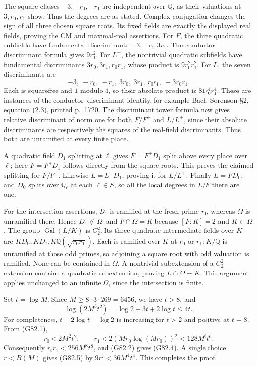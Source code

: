 The square classes \(-3,-r_0,-r_1\) are independent over \(\mathbb Q\), as their valuations at \(3,r_0,r_1\) show. Thus the degrees are as stated. Complex conjugation changes the sign of all three chosen square roots. Its fixed fields are exactly the displayed real fields, proving the CM and maximal-real assertions.
For \(F\), the three quadratic subfields have fundamental discriminants \(-3,-r_1,3r_1\). The conductor--discriminant formula gives \(9r_1^2\). For \(L^+\), the nontrivial quadratic subfields have fundamental discriminants \(3r_0,3r_1,r_0r_1\), whose product is \(9r_0^2r_1^2\). For \(L\), the seven discriminants are
\[
 -3,\ -r_0,\ -r_1,\ 3r_0,\ 3r_1,\ r_0r_1,\ -3r_0r_1.
\]
Each is squarefree and \(1\) modulo \(4\), so their absolute product is \(81r_0^4r_1^4\). These are instances of the conductor--discriminant identity, for example Bach--Sorenson \S2, equation (2.3), printed p.\ 1720. The discriminant tower formula now gives relative discriminant of norm one for both \(F/F^+\) and \(L/L^+\), since their absolute discriminants are respectively the squares of the real-field discriminants. Thus both are unramified at every finite place.

A quadratic field \(D_1\) splitting at \(\ell\) gives \(F=F^+D_1\) split above every place over \(\ell\); here \(F=F^+D_1\) follows directly from the square roots. This proves the claimed splitting for \(F/F^+\). Likewise \(L=L^+D_1\), proving it for \(L/L^+\). Finally \(L=FD_0\), and \(D_0\) splits over \(\mathbb Q_\ell\) at each \(\ell\in S\), so all the local degrees in \(L/F\) there are one.

For the intersection assertions, \(D_1\) is ramified at the fresh prime \(r_1\), whereas \(\Omega\) is unramified there. Hence \(D_1\not\subset\Omega\), and \(F\cap\Omega=K\) because \([F:K]=2\) and \(K\subset\Omega\). The group \(\operatorname{Gal}(L/K)\) is \(C_2^2\). Its three quadratic intermediate fields over \(K\) are \(KD_0,KD_1,K\mathbb Q(\sqrt{r_0r_1})\). Each is ramified over \(K\) at \(r_0\) or \(r_1\): \(K/\mathbb Q\) is unramified at those odd primes, so adjoining a square root with odd valuation is ramified. None can be contained in \(\Omega\). A nontrivial subextension of a \(C_2^2\)-extension contains a quadratic subextension, proving \(L\cap\Omega=K\). This argument applies unchanged to an infinite \(\Omega\), since the intersection is finite.

Set \(t=\log M\). Since \(M\geq8\cdot3\cdot269=6456\), we have \(t>8\), and
\[
 \log(2M^3t^2)=\log2+3t+2\log t\leq4t.
\]
For completeness, \(t-2\log t-\log2\) is increasing for \(t>2\) and positive at \(t=8\). From (G82.1),
\[
 r_0<2M^2t^2,\qquad
 r_1<2(Mr_0\log(Mr_0))^2
       <128M^6t^6.
\]
Consequently \(r_0r_1<256M^8t^8\), and (G82.2) gives (G82.4). A single choice \(r<B(M)\) gives (G82.5) by \(9r^2<36M^4t^4\). This completes the proof.

